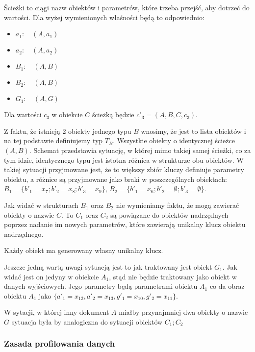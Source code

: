 Ścieżki to ciągi nazw obiektów i parametrów, które trzeba przejść, 
aby dotrzeć do wartości. Dla wyżej wymienionych właśności będą to odpowiednio:

\begin{itemize}
  \item $a_1\colon\quad(A, a_1)$
  \item $a_2\colon\quad(A, a_2)$
  \item $B_1\colon\quad(A, B)$
  \item $B_2\colon\quad(A, B)$
  \item $G_1\colon\quad(A, G)$
\end{itemize}

Dla wartości $c_3$ w obiekcie $C$ ścieżką będzie $c'_3=(A, B, C, c_3)$.

Z faktu, że istnieją 2 obiekty jednego typu $B$ wnosimy, że jest 
to lista obiektów i na tej podstawie definiujemy typ $T_B$.
Wszystkie obiekty o identycznej ścieżce $(A, B)$. Schemat
przedstawia sytuację, w której mimo takiej samej ścieżki, co za tym
idzie, identycznego typu jest istotna różnica w strukturze obu obiektów.
W takiej sytuacji przyjmowane jest, że to większy zbiór kluczy definiuje
parametry obiektu, a różnice są przyjmowane jako braki w poszczególnych
obiektach: $B_1 = \{ b'_1 = x_7; b'_2 = x_8; b'_3 = x_9 \}$,
$B_2 = \{ b'_1 = x_6; b'_2 = \emptyset; b'_3 = \emptyset \}$.

Jak widać w strukturach $B_1$ oraz $B_2$ nie wymieniamy faktu,
że mogą zawierać obiekty o nazwie $C$. To $C_1$ oraz $C_2$ są
powiązane do obiektów nadrzędnych poprzez nadanie im nowych
parametrów, które zawierają unikalny klucz obiektu nadrzędnego.

Każdy obiekt ma generowany własny unikalny klucz.

Jeszcze jedną wartą uwagi sytuacją jest to jak traktowany jest 
obiekt $G_1$. Jak widać jest on jedyny w obiekcie $A_1$, stąd
nie będzie traktowany jako obiekt w danych wyjściowych. Jego
parametry będą parametrami obiektu $A_1$ co da obraz obiektu $A_1$
jako $\{a'_1 = x_{12}, a'_2 = x_{13}, g'_1 = x_{10}, g'_2 = x_{11} \}$.

W sytacji, w której inny dokument $A$ miałby przynajmniej dwa obiekty
o nazwie $G$ sytuacja była by analogiczna do sytuacji obiektów $C_1; C_2$



\subsubsection{Zasada profilowania danych}

